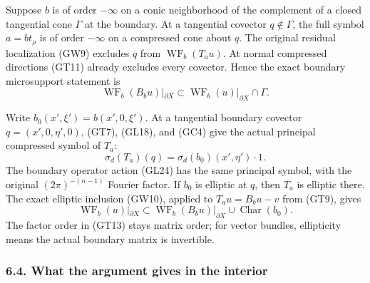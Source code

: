 \documentclass[
  11pt,
]{article}
\begin{document}
Suppose \(b\) is of order \(-\infty\) on a conic neighborhood of the
complement of a closed tangential cone \(\Gamma\) at the boundary. At a
tangential covector \(q\notin\Gamma\), the full symbol \(a=b t_\rho\) is
of order \(-\infty\) on a compressed cone about \(q\). The original
residual localization (GW9) excludes \(q\) from
\(\operatorname{WF}_b(T_au)\). At normal compressed directions (GT11)
already excludes every covector. Hence the exact boundary microsupport
statement is \[
 \operatorname{WF}_b(B_bu)|_{\partial X}
 \subset\operatorname{WF}_b(u)|_{\partial X}\cap\Gamma.
 \tag{GT12}
\]

Write \(b_0(x',\xi')=b(x',0,\xi')\). At a tangential boundary covector
\(q=(x',0,\eta',0)\), (GT7), (GL18), and (GC4) give the actual principal
compressed symbol of \(T_a\): \[
 \sigma_d(T_a)(q)=\sigma_d(b_0)(x',\eta')\cdot 1.
 \tag{GT13}
\] The boundary operator action (GL24) has the same principal symbol,
with the original \((2\pi)^{-(n-1)}\) Fourier factor. If \(b_0\) is
elliptic at \(q\), then \(T_a\) is elliptic there. The exact elliptic
inclusion (GW10), applied to \(T_au=B_bu-v\) from (GT9), gives \[
 \operatorname{WF}_b(u)|_{\partial X}
   \subset
   \operatorname{WF}_b(B_bu)|_{\partial X}
       \cup\operatorname{Char}(b_0).
 \tag{GT14}
\] The factor order in (GT13) stays matrix order; for vector bundles,
ellipticity means the actual boundary matrix is invertible.

\subsubsection{6.4. What the argument gives in the
interior}\label{what-the-argument-gives-in-the-interior}
\end{document}
